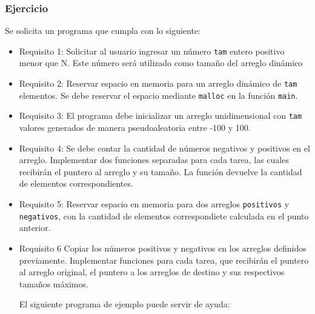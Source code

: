 \subsubsection{Ejercicio}
Se solicita un programa que cumpla con lo siguiente:
\begin{itemize}[a)]
  \item Requisito 1:
    Solicitar al usuario ingresar un número \texttt{tam} entero positivo menor que N. Este número será utilizado como tamaño del arreglo dinámico
  \item Requisito 2:
    Reservar espacio en memoria para un arreglo dinámico de \texttt{tam} elementos. Se debe reservar el espacio mediante \texttt{malloc} en la función \texttt{main}.

  \item Requisito 3:
    El programa debe inicializar un arreglo unidimensional con \texttt{tam} valores generados de manera pseudoaleatoria entre -100 y 100.

  \item Requisito 4:
    Se debe contar la cantidad de números negativos y positivos en el arreglo. Implementar dos funciones separadas para cada tarea, las cuales recibirán el puntero al arreglo y su tamaño. La función devuelve la cantidad de elementos correspondientes.

  \item Requisito 5:
    Reservar espacio en memoria para dos arreglos \texttt{positivos} y \texttt{negativos}, con la cantidad de elementos correspondiete calculada en el punto anterior.

  \item Requisito 6
    Copiar los números positivos y negativos en los arreglos definidos previamente. Implementar funciones para cada tarea, que recibirán el puntero al arreglo original, el puntero a los arreglos de destino y sus respectivos tamaños máximos.

    El siguiente programa de ejemplo puede servir de ayuda:

    \lstset{inputencoding=utf8/latin1}
    
\end{itemize}


